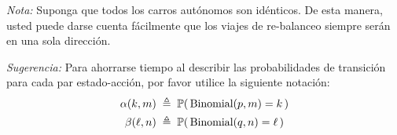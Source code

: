 \documentclass[ a4paper, twoside, 11pt]{article}
\begin{document}
\begin{problem}
\emph{Nota:} Suponga que todos los carros aut\'onomos son id\'enticos. De esta manera, usted puede darse cuenta f\'acilmente que los viajes de re-balanceo siempre ser\'an en una sola direcci\'on. 

\emph{Sugerencia:} Para ahorrarse tiempo al describir las probabilidades de transici\'on para cada par estado-acci\'on, por favor utilice la siguiente notaci\'on: 
\begin{align*}
\alpha(k,m) \; & \triangleq \; \mathbb{P}( \, \text{Binomial}(p,m) = k \, ) \\
\beta(\ell,n) \; & \triangleq \; \mathbb{P}( \, \text{Binomial}(q,n) = \ell \, )
\end{align*}

\end{problem}
\fullskip
\end{document}
